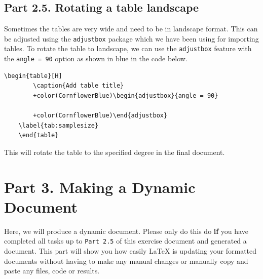 \documentclass[12pts]{report}
\begin{document}
\subsection*{Part 2.5. Rotating a table landscape}

Sometimes the tables are very wide and need to be in landscape format. This can be adjusted using the \texttt{adjustbox} package which we have been using for importing tables. To rotate the table to landscape, we can use the \texttt{adjustbox} feature with the \texttt{angle = 90} option as shown in blue in the code below.

\begin{Verbatim}[commandchars=+\(\)]
	\begin{table}[H]
		\caption{Add table title}
		+color(CornflowerBlue)\begin{adjustbox}{angle = 90} 
		
		+color(CornflowerBlue)\end{adjustbox}
	\label{tab:samplesize}
	\end{table}
\end{Verbatim}

This will rotate the table to the specified degree in the final document. 

\section*{Part 3. Making a Dynamic Document}

Here, we will produce a dynamic document. Please only do this do \textbf{if} you have completed all tasks up to \texttt{Part 2.5} of this exercise document and generated a document. This part will show you how easily {\LaTeX} is updating your formatted documents without having to make any manual changes or manually copy and paste any files, code or results.
\end{document}
